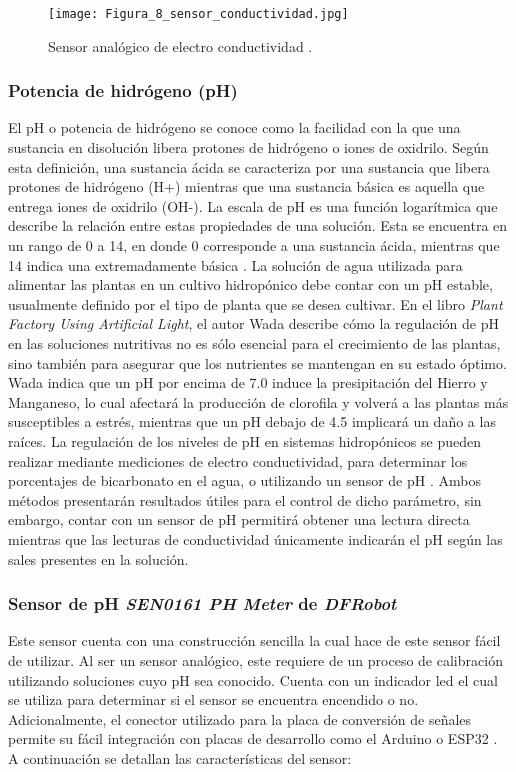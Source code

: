\begin{figure}[H]
	\centering
	\texttt{[image: Figura\_8\_sensor\_conductividad.jpg]}
	\caption{Sensor analógico de electro conductividad \cite{DFRobot_ECsensor}.}
	\label{fig:mesh8}
\end{figure}
	
\subsubsection*{Potencia de hidrógeno (pH)}
El pH o potencia de hidrógeno se conoce como la facilidad con la que una sustancia en disolución libera protones de hidrógeno o iones de oxidrilo. Según esta definición, una sustancia ácida se caracteriza por una sustancia que libera protones de hidrógeno (H+) mientras que una sustancia básica es aquella que entrega iones de oxidrilo (OH-). La escala de pH es una función logarítmica que describe la relación entre estas propiedades de una solución. Esta se encuentra en un rango de 0 a 14, en donde 0 corresponde a una sustancia ácida, mientras que 14 indica una extremadamente básica \cite{chang_quimica_1995}. La solución de agua utilizada para alimentar las plantas en un cultivo hidropónico debe contar con un pH estable, usualmente definido por el tipo de planta que se desea cultivar. En el libro \textit{Plant Factory Using Artificial Light}, el autor Wada describe cómo la regulación de pH en las soluciones nutritivas no es sólo esencial para el crecimiento de las plantas, sino también para asegurar que los nutrientes se mantengan en su estado óptimo. Wada indica que un pH por encima de 7.0 induce la presipitación del Hierro y Manganeso, lo cual afectará la producción de clorofila y volverá a las plantas más susceptibles a estrés, mientras que un pH debajo de 4.5 implicará un daño a las raíces. La regulación de los niveles de pH en sistemas hidropónicos se pueden realizar mediante mediciones de electro conductividad, para determinar los porcentajes de bicarbonato en el agua, o utilizando un sensor de pH \cite{wada_theory_2019}. Ambos métodos presentarán resultados útiles para el control de dicho parámetro, sin embargo, contar con un sensor de pH permitirá obtener una lectura directa mientras que las lecturas de conductividad únicamente indicarán el pH según las sales presentes en la solución.
	
\subsubsection*{Sensor de pH \textit{SEN0161 PH Meter} de \textit{DFRobot}}
Este sensor cuenta con una construcción sencilla la cual hace de este sensor fácil de utilizar. Al ser un sensor analógico, este requiere de un proceso de calibración utilizando soluciones cuyo pH sea conocido. Cuenta con un indicador led el cual se utiliza para determinar si el sensor se encuentra encendido o no. Adicionalmente, el conector utilizado para la placa de conversión de señales permite su fácil integración con placas de desarrollo como el Arduino o ESP32 \cite{DFRobot_PHsensor}. A continuación se detallan las características del sensor:

